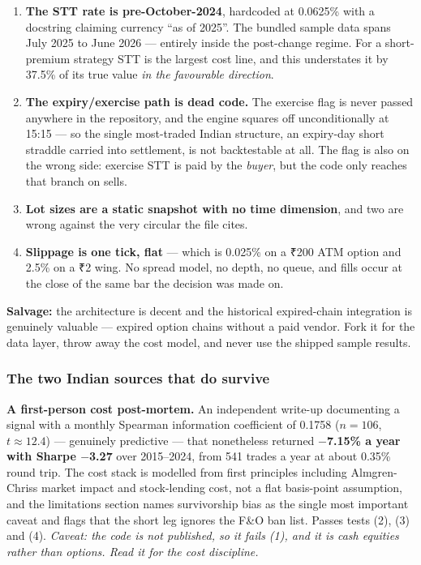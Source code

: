 \documentclass[11pt,a4paper]{article}
\newcommand{\rs}{₹}
\begin{document}
\begin{enumerate}
\item \textbf{The STT rate is pre-October-2024}, hardcoded at 0.0625\% with a
docstring claiming currency ``as of 2025''. The bundled sample data spans
July 2025 to June 2026 --- entirely inside the post-change regime. For a
short-premium strategy STT is the largest cost line, and this understates it by
37.5\% of its true value \emph{in the favourable direction}.
\item \textbf{The expiry/exercise path is dead code.} The exercise flag is never
passed anywhere in the repository, and the engine squares off unconditionally at
15:15 --- so the single most-traded Indian structure, an expiry-day short straddle
carried into settlement, is not backtestable at all. The flag is also on the wrong
side: exercise STT is paid by the \emph{buyer}, but the code only reaches that
branch on sells.
\item \textbf{Lot sizes are a static snapshot with no time dimension}, and two are
wrong against the very circular the file cites.
\item \textbf{Slippage is one tick, flat} --- which is 0.025\% on a \rs 200 ATM
option and 2.5\% on a \rs 2 wing. No spread model, no depth, no queue, and fills
occur at the close of the same bar the decision was made on.
\end{enumerate}

\textbf{Salvage:} the architecture is decent and the historical expired-chain
integration is genuinely valuable --- expired option chains without a paid vendor.
Fork it for the data layer, throw away the cost model, and never use the shipped
sample results.

\subsubsection{The two Indian sources that do survive}

\textbf{A first-person cost post-mortem.} An independent write-up documenting a
signal with a monthly Spearman information coefficient of 0.1758 ($n=106$,
$t \approx 12.4$) --- genuinely predictive --- that nonetheless returned
\textbf{$-$7.15\% a year with Sharpe $-$3.27} over 2015--2024, from 541 trades a
year at about 0.35\% round trip. The cost stack is modelled from first principles
including Almgren-Chriss market impact and stock-lending cost, not a flat
basis-point assumption, and the limitations section names survivorship bias as the
single most important caveat and flags that the short leg ignores the F\&O ban
list. Passes tests (2), (3) and (4). \emph{Caveat: the code is not published, so
it fails (1), and it is cash equities rather than options. Read it for the cost
discipline.}
\end{document}
